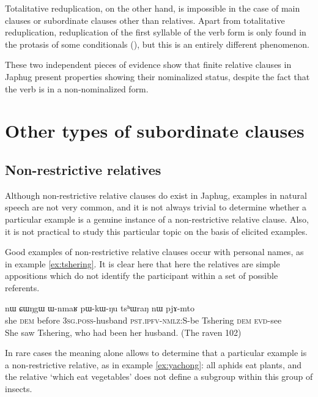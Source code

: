 \documentclass[oldfontcommands,oneside,a4paper,11pt]{article}
\newcommand{\ipa}[1]{{\phon #1}} %
\newcommand{\topic}{\textsc{dem}}
\begin{document}
Totalitative reduplication, on the other hand, is impossible in the case of main clauses or subordinate clauses other than relatives. Apart from totalitative reduplication, reduplication of the first syllable of the verb form is only found in the protasis of some conditionals (\citealt{jacques14linking}), but this is an entirely different phenomenon.

These two independent pieces of evidence show that finite relative clauses in Japhug present properties showing their nominalized status, despite the fact that the verb is in a non-nominalized form.

\section{Other types of subordinate clauses}  

\subsection{Non-restrictive relatives}  \label{sec:non.restrictive} 

Although non-restrictive relative clauses do exist in Japhug, examples in natural speech are not very common, and it is not always trivial to determine whether a particular example is a genuine instance of a non-restrictive relative clause. Also, it is not practical to study this particular topic on the basis of elicited examples.

Good examples of non-restrictive relative clauses occur with personal names,  as in example \ref{ex:tshering}. It is clear here that here the relatives are simple appositions which do not identify the participant within a set of possible referents.


\begin{exe}
   \ex \label{ex:tshering}
\gll  \ipa{ɯʑo}  	\ipa{nɯ} \ipa{ɕɯŋgɯ}  	\ipa{ɯ-nmaʁ}  	\ipa{pɯ-kɯ-ŋu}  	\ipa{tsʰɯraŋ}  	\ipa{nɯ}  	\ipa{pjɤ-mto}  	\\
she \textsc{dem} before \textsc{3sg.poss}-husband \textsc{pst.ipfv-nmlz:S}-be Tshering \topic{} \textsc{evd}-see \\
 \glt   She saw Tshering, who had been her husband. (The raven 102)
   \end{exe} 

In rare cases the meaning alone allows to determine that a particular example  is a non-restrictive relative, as in example \ref{ex:yachong}: all aphids eat plants, and the relative `which eat vegetables' does not define a subgroup within this group of insects.
\end{document}
